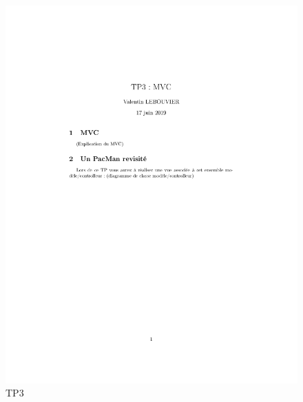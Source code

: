\documentclass[11pt]{article}
\begin{document}
\begin{figure}[htb]
\centering
\includegraphics[width=.9\linewidth]{../TP/TP3/TP3.pdf}
\caption{\label{TP3}TP3}
\end{figure}
\end{document}
